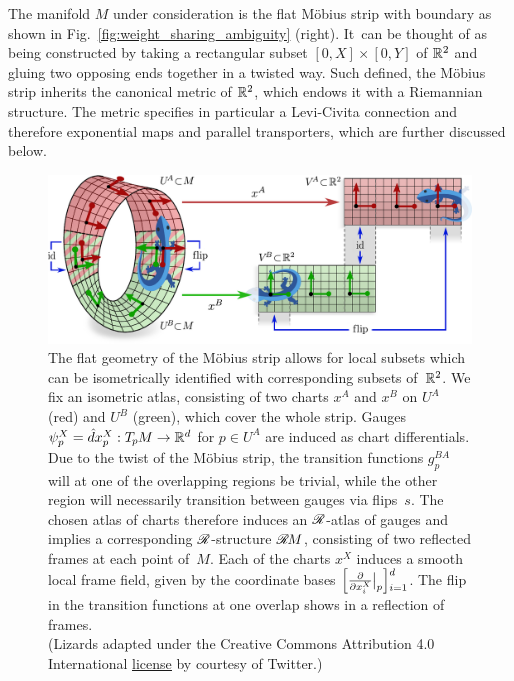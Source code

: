 The manifold $M$ under consideration is the flat M\"obius strip with boundary as shown in Fig.~\ref{fig:weight_sharing_ambiguity} (right).
It~can be thought of as being constructed by taking a rectangular subset $[0,X] \times [0,Y]$ of $\mathbb{R}^2$ and gluing two opposing ends together in a twisted way.
Such defined, the M\"obius strip inherits the canonical metric of $\mathbb{R}^2$, which endows it with a Riemannian structure.
The metric specifies in particular a Levi-Civita connection and therefore exponential maps and parallel transporters, which are further discussed below.

\begin{figure}
    \centering
    \includegraphics[width=\columnwidth]{figures/mobius_conv_gauges.pdf}
    \vspace*{.5ex}
    \caption{\small
        The flat geometry of the M\"obius strip allows for local subsets which can be isometrically identified with corresponding subsets of~$\mathbb{R}^2$.
        We fix an isometric atlas, consisting of two charts $x^A$ and $x^B$ on $U^A$ (red) and $U^B$ (green), which cover the whole strip.
        Gauges $\psi_p^X = \hat{d}x_p^X: T_{\mkern-1.5mu p}\mkern-.5muM \to \mathbb{R}^d$ for $p\in U^A$ are induced as chart differentials.
        Due to the twist of the M\"obius strip, the transition functions $g_p^{BA}$ will at one of the overlapping regions be trivial, while the other region will necessarily transition between gauges via flips~$s$.
        The chosen atlas of charts therefore induces an $\mathscr{R}$-atlas of gauges and implies a corresponding $\mathscr{R}$-structure $\mathscr{R}\mkern-1.8muM$, consisting of two reflected frames at each point of~$M$.
        Each of the charts $x^X$ induces a smooth local frame field, given by the coordinate bases
        $\Big[\frac{\partial}{\partial x_i^X} \mkern-1mu\big|_p \Big] \raisebox{-2pt}{$\rule{0pt}{11pt}_{i=1}^d$}$.
        The flip in the transition functions at one overlap shows in a reflection of frames.
        {
        \\ \color{gray} \scriptsize
            (Lizards adapted under the Creative Commons Attribution 4.0 International
            \href{https://github.com/twitter/twemoji/blob/gh-pages/LICENSE-GRAPHICS}{\underline{license}}
            by courtesy of Twitter.)
        }
    }
    \label{fig:mobius_conv_gauges}
\end{figure}

